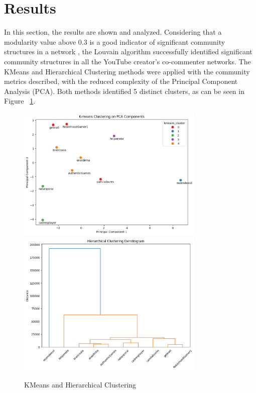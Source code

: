 \documentclass[12pt]{article}
\begin{document}
\section{Results}

In this section, the results are shown and analyzed. 
Considering that a modularity value above 0.3 is a good indicator of significant
community structures in a network \cite{PhysRevE.70.066111}, the Louvain algorithm successfully 
identified significant community structures in all the YouTube creator's co-commenter networks.
The KMeans and Hierarchical Clustering methods were applied with the community metrics described, 
with the reduced complexity of the Principal Component Analysis (PCA). 
Both methods identified 5 distinct clusters, as can be seen in Figure ~\ref{fig:kmeans_hierarchical}.

\begin{figure}[hbt!]
    \centering
    \includegraphics[width=0.8\textwidth]{./imgs/KMeans_PCA.png}
    \vspace{0.5cm} %
    \includegraphics[width=0.8\textwidth]{./imgs/Hierarchical_clustering.png}
    \caption{KMeans and Hierarchical Clustering}
    \label{fig:kmeans_hierarchical}
\end{figure}
\end{document}
